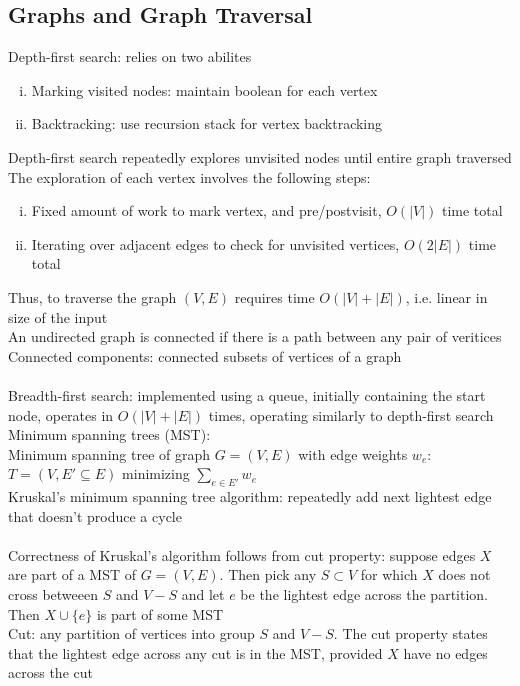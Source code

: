\documentclass{article}
\begin{document}
		\subsection{Graphs and Graph Traversal}
			Depth-first search: relies on two abilites
			\begin{enumerate}[(i)]
				\item Marking visited nodes: maintain boolean for each vertex
				\item Backtracking: use recursion stack for vertex backtracking
				\end{enumerate}
			Depth-first search repeatedly explores unvisited nodes until entire graph traversed \\
			The exploration of each vertex involves the following steps:
			\begin{enumerate}[(i)]
				\item Fixed amount of work to mark vertex, and pre/postvisit, $O(|V|)$ time total
				\item Iterating over adjacent edges to check for unvisited vertices, $O(2|E|)$ time total
				\end{enumerate}
			Thus, to traverse the graph $(V, E)$ requires time $O(|V| + |E|)$, i.e. linear in size of the input \\
			An undirected graph is connected if there is a path between any pair of veritices \\
			Connected components: connected subsets of vertices of a graph \\
			\\
			Breadth-first search: implemented using a queue, initially containing the start node, operates in $O(|V| + |E|)$ times, operating similarly to depth-first search
			\\
			Minimum spanning trees (MST): \\
			Minimum spanning tree of graph $G = (V, E)$ with edge weights $w_e$: $T = (V, E' \subseteq E)$ minimizing $\sum_{e \in E'}w_e$ \\
			Kruskal's minimum spanning tree algorithm: repeatedly add next lightest edge that doesn't produce a cycle \\
			\\
			Correctness of Kruskal's algorithm follows from cut property: suppose edges $X$ are part of a MST of $G = (V, E)$. Then pick any $S \subset V$ for which $X$ does not cross betweeen $S$ and $V - S$ and let $e$ be the lightest edge across the partition. Then $X \cup \{e\}$ is part of some MST \\
			Cut: any partition of vertices into group $S$ and $V - S$. The cut property states that the lightest edge across any cut is in the MST, provided $X$ have no edges across the cut \\
\end{document}
